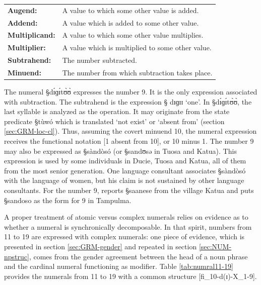 \begin{tabular}{ll}
{\bf Augend:} & A value to which some other value is
added.\\
{\bf Addend:} & A value which is added to some other
value.\\
{\bf Multiplicand:} & A value to which some other
value multiplies.\\

{\bf Multiplier:} & A value which is multiplied to
some other value. \\

{\bf Subtrahend:}  & The number subtracted.\\
{\bf Minuend:}  & The number from which subtraction takes
place.\\
\end{tabular}
\vspace*{10pt}


The numeral {\S dɪ́ɡɪ́tʊ̀ʊ̀} expresses the number 9. It is the only
expression associated with subtraction.  The subtrahend is the expression {\S
dɪɡɪɪ} `one'.   In {\S dɪ́ɡɪ́tʊ̀ʊ̀},  the last syllable   is analyzed
as the
operation. It may originate from the state predicate  {\S tùwó} which is
translated 
`not exist'  or `absent from' (section \ref{sec:GRM-loc-cl}). Thus, assuming the
covert minuend 10, the numeral
expression receives the functional notation [1 {\sc absent from} 10], or 10
minus 1.  The number 9 may also be expressed as {\S sàndòsó}  (or
{\S sandʊsə} in Tuosa and Katua). This expression is
used by some individuals in Ducie, Tuosa and Katua, all of them from the most
senior generation.  One language consultant
associates  {\S sàndòsó} with the language of women, but his claim is not
sustained by other language consultants. For the number 9, \citet[33]{Good54}
reports
{\S saanese}
from the village Katua and  \citet[117]{Ratt32b} puts {\S sandoso} as the form
 for 9 in Tampulma. 

 
A proper  treatment of  atomic versus  complex numerals   relies  on evidence as
to whether
a numeral is synchronically  decomposable. In  that spirit,  numbers from 
11 to 19 are expressed with  complex numerals:  one piece of evidence, which is
presented in section \ref{sec:GRM-gender} and repeated in section
\ref{sec:NUM-npstruc}, comes from the gender agreement between the head of a
noun phrase and the
cardinal numeral functioning as modifier.  Table \ref{tab:numral11-19}
provides the  numerals from 11 to 19 with a common structure
[fi_{10}-d(ɪ)-X_{1-9}]. 




